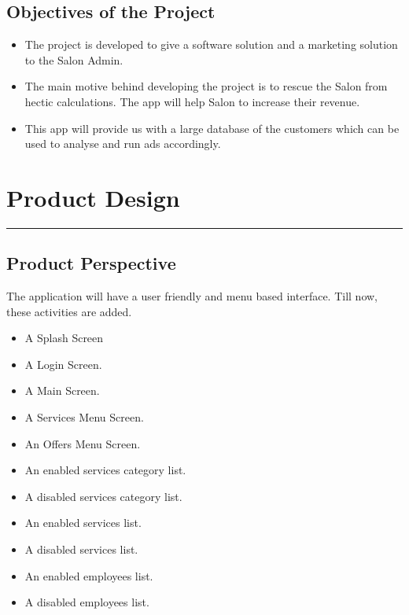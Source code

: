 \section{Objectives of the Project }
\begin{itemize}
	\item The project is developed to give a software solution and a marketing solution to the Salon Admin.
	\item The main motive behind developing the project is to rescue the Salon from hectic calculations. The app will help Salon to increase their revenue.
	\item This app will provide us with a large database of the customers which can be used to analyse and run ads accordingly.
\end{itemize}


\chapter{Product Design}\hrule
\label{Chapter:3}

\section{Product Perspective}
The application will have a user friendly and menu based interface. Till now, these activities are added.
\begin{itemize}
	\item A Splash Screen
	\item A Login Screen.
	\item A Main Screen.
	\item A Services Menu Screen.
	\item An Offers Menu Screen.
	
	\item An enabled services category list.
	\item A disabled services category list.
	\item An enabled services list.
	\item A disabled services list.
	
	\item An enabled employees list.
	\item A disabled employees list.

	
\end{itemize}
